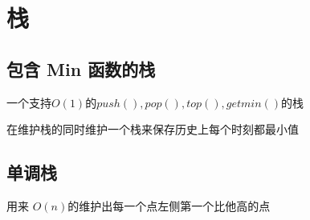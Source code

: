 \section{栈}
\subsection{包含 Min 函数的栈}
一个支持$O(1)$的$push(),pop(),top(),getmin()$的栈

在维护栈的同时维护一个栈来保存历史上每个时刻都最小值


\subsection{单调栈}
用来 $O(n)$的维护出每一个点左侧第一个比他高的点
